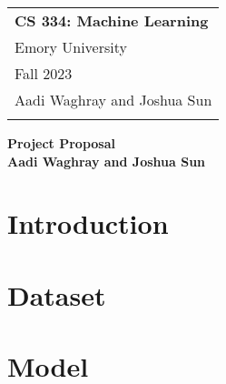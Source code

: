 \documentclass{article}
\begin{document}
\thispagestyle{empty}

\begin{tabular}{p{10.5cm}} 
	{\large \bf CS 334: Machine Learning} \\
	Emory University\\ Fall 2023  \\ Aadi Waghray and Joshua Sun\\
	\bottomrule
	\\
\end{tabular}

\vspace*{0.3cm}

\begin{center}
	{\Large \bf Project Proposal}\\
	\vspace*{0.02cm}
	{\bf Aadi Waghray and Joshua Sun}
\end{center}

\vspace{0.4cm}

\section{Introduction}


\section{Dataset}


\section{Model}

\end{document}
